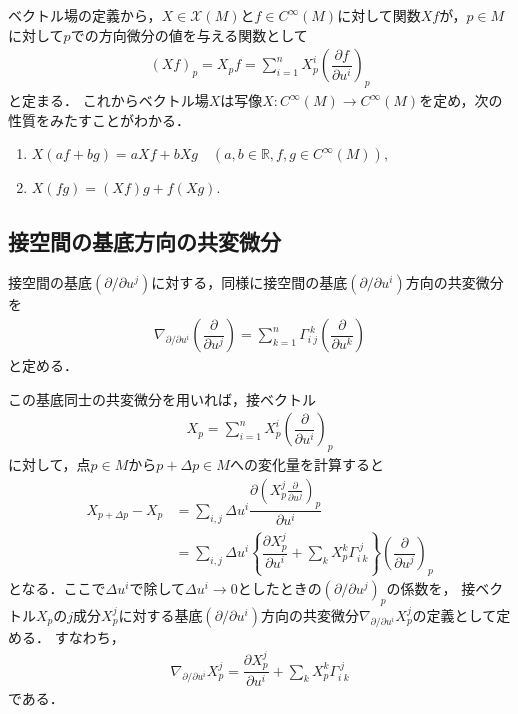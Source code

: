 \documentclass[dvipdfmx, a4paper,10pt]{jsarticle}
\theoremstyle{definition}
\newcommand{\eq}[1]{\begin{align}#1\end{align}}
\newcommand{\enums}[1]{\begin{enumerate}#1\end{enumerate}}
\begin{document}
ベクトル場の定義から，$X\in\mathscr{X}(M)$と$f\in C^\infty(M)$に対して関数$Xf$が，$p\in M$に対して$p$での方向微分の値を与える関数として
\eq{(Xf)_p=X_pf=\sum_{i=1}^nX^i_p\left(\dfrac{\partial f}{\partial u^i}\right)_p\label{VectorFieldOperation1}}
と定まる．
これからベクトル場$X$は写像$X:C^\infty(M)\rightarrow C^\infty(M)$を定め，次の性質をみたすことがわかる．
\enums{\item $X(af+bg)=aXf+bXg\quad(a,b\in\mathbb{R},f,g\in C^\infty(M)),$ \item $X(fg)=(Xf)g+f(Xg).$}


%
%
\subsection{接空間の基底方向の共変微分}
接空間の基底$(\partial/\partial u^j)$に対する，同様に接空間の基底$(\partial/\partial u^i)$方向の共変微分を
\eq{\nabla_{\partial/\partial u^i}\left(\dfrac{\partial}{\partial u^j}\right)=\sum_{k=1}^n\Gamma_{i\ j}^{\ k}\left(\dfrac{\partial}{\partial u^k}\right)}
と定める．

この基底同士の共変微分を用いれば，接ベクトル
\eq{X_p=\sum_{i=1}^nX^i_p\left(\dfrac{\partial}{\partial u^i}\right)_p}
に対して，点$p\in M$から$p+\Delta p\in M$への変化量を計算すると
\eq{
	X_{p+\Delta p}-X_p
	&=\sum_{i,j}\Delta u^i\dfrac{\partial\left(X^j_p\frac{\partial}{\partial u^j}\right)_p}{\partial u^i}\\
	&=\sum_{i,j}\Delta u^i\left\{\dfrac{\partial X^j_p}{\partial u^i}+\sum_{k}X^k_p\Gamma_{i\ k}^{\ j}\right\}\left(\dfrac{\partial}{\partial u^j}\right)_p
}
となる．ここで$\Delta u^i$で除して$\Delta u^i\rightarrow0$としたときの$\left(\partial/\partial u^j\right)_p$の係数を，
接ベクトル$X_p$の$j$成分$X^j_p$に対する基底$(\partial/\partial u^i)$方向の共変微分$\nabla_{\partial/\partial u^i}X^j_p$の定義として定める．
すなわち，
\eq{\nabla_{\partial/\partial u^i}X^j_p=\dfrac{\partial X^j_p}{\partial u^i}+\sum_{k}X^k_p\Gamma_{i\ k}^{\ j}}
である．
\end{document}
